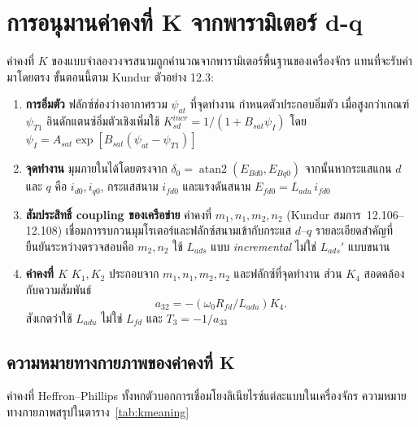 \documentclass[12pt,a4paper]{article}
\begin{document}
\section{การอนุมานค่าคงที่ K จากพารามิเตอร์ d-q}
\label{sec:kderiv}

ค่าคงที่ $K$ ของแบบจำลองวงจรสนามถูกคำนวณจากพารามิเตอร์พื้นฐานของเครื่องจักร
แทนที่จะรับค่ามาโดยตรง ขั้นตอนนี้ตาม Kundur ตัวอย่าง 12.3:

\begin{enumerate}
    \item \textbf{การอิ่มตัว} ฟลักซ์ช่องว่างอากาศรวม $\psi_{at}$ ที่จุดทำงาน
          กำหนดตัวประกอบอิ่มตัว เมื่อสูงกว่าเกณฑ์ $\psi_{T1}$
          อินดักแตนซ์อิ่มตัวเชิงเพิ่มใช้
          $K_{sd}^{incr} = 1/(1 + B_{sat}\psi_I)$ โดย
          $\psi_I = A_{sat}\exp[B_{sat}(\psi_{at}-\psi_{T1})]$
    \item \textbf{จุดทำงาน} มุมภายในได้โดยตรงจาก
          $\delta_0 = \operatorname{atan2}(E_{Bd0}, E_{Bq0})$
          จากนั้นหากระแสแกน $d$ และ $q$ คือ $i_{d0}, i_{q0}$,
          กระแสสนาม $i_{fd0}$ และแรงดันสนาม $E_{fd0} = L_{adu}\,i_{fd0}$
    \item \textbf{สัมประสิทธิ์ coupling ของเครือข่าย} ค่าคงที่
          $m_1, n_1, m_2, n_2$ (Kundur สมการ~12.106--12.108)
          เชื่อมการรบกวนมุมโรเตอร์และฟลักซ์สนามเข้ากับกระแส $d$--$q$
          รายละเอียดสำคัญที่ยืนยันระหว่างตรวจสอบคือ $m_2, n_2$
          ใช้ $L_{ads}$ แบบ \emph{incremental} ไม่ใช่ $L_{ads}'$ แบบขนาน
    \item \textbf{ค่าคงที่ $K$} $K_1, K_2$ ประกอบจาก
          $m_1, n_1, m_2, n_2$ และฟลักซ์ที่จุดทำงาน
          ส่วน $K_4$ สอดคล้องกับความสัมพันธ์
          \[
          a_{32} = -(\omega_0 R_{fd}/L_{adu})K_4.
          \]
          สังเกตว่าใช้ $L_{adu}$ ไม่ใช่ $L_{fd}$ และ
          $T_3 = -1/a_{33}$
\end{enumerate}

\subsection{ความหมายทางกายภาพของค่าคงที่ K}

ค่าคงที่ Heffron--Phillips ทั้งหกตัวบอกการเชื่อมโยงลิเนียไรซ์แต่ละแบบในเครื่องจักร
ความหมายทางกายภาพสรุปในตาราง~\ref{tab:kmeaning}
\end{document}
